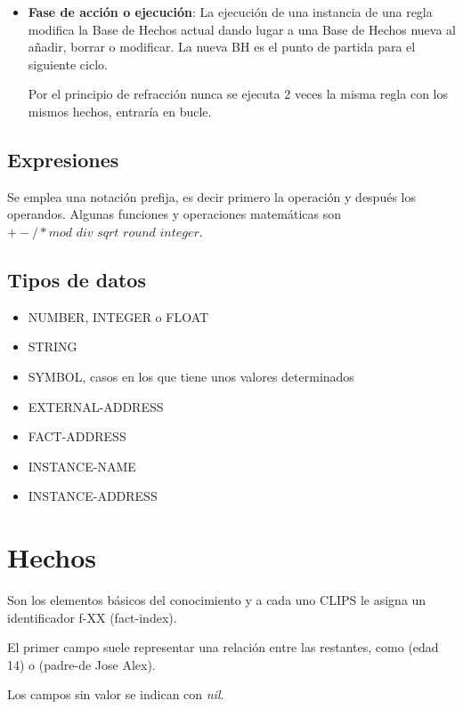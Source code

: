\documentclass[12pt, twoside, openright]{report} %
\begin{document}
\begin{itemize}
\begin{itemize}
\begin{itemize}
		            \end{itemize}

		            \pagebreak
		      \item \textbf{Fase de acción o ejecución}: La ejecución de una instancia de una regla modifica la Base de Hechos actual dando lugar a una Base de Hechos nueva al añadir, borrar o modificar. La nueva BH es el punto de partida para el siguiente ciclo.

		            Por el principio de refracción nunca se ejecuta 2 veces la misma regla con los mismos hechos, entraría en bucle.
	      \end{itemize}
\end{itemize}

\subsection{Expresiones}
Se emplea una notación prefija, es decir primero la operación y después los operandos. Algunas funciones y operaciones matemáticas son $+ - / * \textit{mod div sqrt round integer}$.

\subsection{Tipos de datos}
\begin{itemize}
	\item NUMBER, INTEGER o FLOAT
	\item STRING
	\item SYMBOL, casos en los que tiene unos valores determinados
	\item EXTERNAL-ADDRESS
	\item FACT-ADDRESS
	\item INSTANCE-NAME
	\item INSTANCE-ADDRESS
\end{itemize}

\section{Hechos}
Son los elementos básicos del conocimiento y a cada uno CLIPS le asigna un identificador f-XX (fact-index).

El primer campo suele representar una relación entre las restantes, como (edad 14) o (padre-de Jose Alex).

Los campos sin valor se indican con \textit{nil}.

\pagebreak
\end{document}
